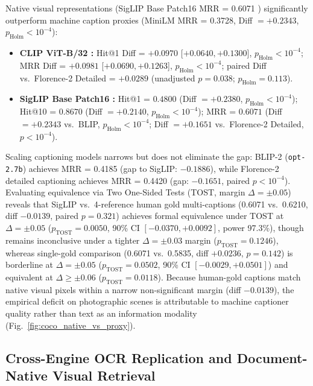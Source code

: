 Native visual representations (SigLIP Base Patch16 MRR = 0.6071 \cite{zhai2023siglip}) significantly outperform machine caption proxies (MiniLM MRR = 0.3728, Diff $= +0.2343$, $p_{\text{Holm}} < 10^{-4}$):
\begin{itemize}
    \setlength{\itemsep}{0.2pt plus 0.1pt}
    \setlength{\parskip}{0pt}
    \item \textbf{CLIP ViT-B/32 \cite{radford2021clip}:} Hit@1 Diff = $+0.0970$ [$+0.0640, +0.1300$], $p_{\text{Holm}} < 10^{-4}$; MRR Diff = $+0.0981$ [$+0.0690, +0.1263$], $p_{\text{Holm}} < 10^{-4}$; paired Diff vs.\ Florence-2 Detailed = $+0.0289$ (unadjusted $p=0.038$; $p_{\text{Holm}} = 0.113$).
    \item \textbf{SigLIP Base Patch16 \cite{zhai2023siglip}:} Hit@1 = $0.4800$ (Diff $= +0.2380$, $p_{\text{Holm}} < 10^{-4}$); Hit@10 = $0.8670$ (Diff $= +0.2140$, $p_{\text{Holm}} < 10^{-4}$); MRR = $0.6071$ (Diff $= +0.2343$ vs.\ BLIP, $p_{\text{Holm}} < 10^{-4}$; Diff $= +0.1651$ vs.\ Florence-2 Detailed, $p < 10^{-4}$).
\end{itemize}
Scaling captioning models narrows but does not eliminate the gap: BLIP-2 (\texttt{opt-2.7b}) \cite{li2023blip2} achieves MRR = 0.4185 (gap to SigLIP: $-0.1886$), while Florence-2 detailed captioning \cite{xiao2024florence2} achieves MRR = 0.4420 (gap: $-0.1651$, paired $p < 10^{-4}$). Evaluating equivalence via Two One-Sided Tests (TOST, margin $\Delta = \pm 0.05$) reveals that SigLIP vs.\ 4-reference human gold multi-captions (0.6071 vs.\ 0.6210, diff $-0.0139$, paired $p=0.321$) achieves formal equivalence under TOST at $\Delta = \pm 0.05$ ($p_{\text{TOST}} = 0.0050$, 90\% CI $[-0.0370, +0.0092]$, power 97.3\%), though remains inconclusive under a tighter $\Delta = \pm 0.03$ margin ($p_{\text{TOST}} = 0.1246$), whereas single-gold comparison (0.6071 vs.\ 0.5835, diff $+0.0236$, $p=0.142$) is borderline at $\Delta = \pm 0.05$ ($p_{\text{TOST}} = 0.0502$, 90\% CI $[-0.0029, +0.0501]$) and equivalent at $\Delta \ge \pm 0.06$ ($p_{\text{TOST}} = 0.0118$). Because human-gold captions match native visual pixels within a narrow non-significant margin (diff $-0.0139$), the empirical deficit on photographic scenes is attributable to machine captioner quality rather than text as an information modality (Fig.~\ref{fig:coco_native_vs_proxy}).

\subsection{Cross-Engine OCR Replication and Document-Native Visual Retrieval}
\label{sec:cross_engine_replication}

